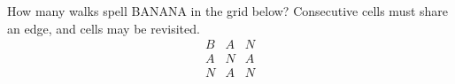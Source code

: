 How many walks spell BANANA in the grid below? Consecutive cells must share an edge, and cells may be revisited.\[\begin{array}{ccc}B&A&N\\A&N&A\\N&A&N\end{array}\]
